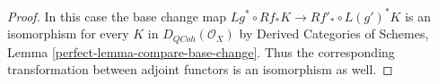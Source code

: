 \documentclass[10pt,a4paper]{amsart}
\theoremstyle{plain}
\theoremstyle{definition}
\theoremstyle{remark}
\numberwithin{equation}{subsection}
\def\QCoh{\mathit{QCoh}}
\begin{document}
\begin{proof}
In this case the base change map
$Lg^* \circ Rf_* K \longrightarrow Rf'_* \circ L(g')^*K$
is an isomorphism for every $K$ in $D_\QCoh(\mathcal{O}_X)$ by
Derived Categories of Schemes, Lemma \ref{perfect-lemma-compare-base-change}.
Thus the corresponding transformation between adjoint functors
is an isomorphism as well.
\end{proof}
\end{document}
